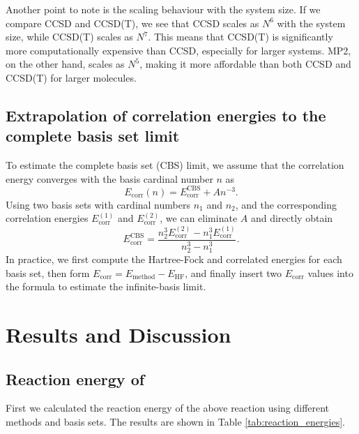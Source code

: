 \documentclass[a4paper,12pt]{scrartcl}
\begin{document}
Another point to note is the scaling behaviour with the system size. If we compare CCSD and CCSD(T), we see that CCSD scales as $N^6$ with the system size, while CCSD(T) scales as $N^7$. This means that CCSD(T) is significantly more computationally expensive than CCSD, especially for larger systems. MP2, on the other hand, scales as $N^5$, making it more affordable than both CCSD and CCSD(T) for larger molecules.

\subsection{Extrapolation of correlation energies to the complete basis set limit}

To estimate the complete basis set (CBS) limit, we assume that the correlation energy converges with the basis cardinal number $n$ as
\[
E_{\mathrm{corr}}(n) = E_{\mathrm{corr}}^{\mathrm{CBS}} + A n^{-3}.
\]
Using two basis sets with cardinal numbers $n_1$ and $n_2$, and the corresponding correlation energies $E_{\mathrm{corr}}^{(1)}$ and $E_{\mathrm{corr}}^{(2)}$, we can eliminate $A$ and directly obtain
\[
E_{\mathrm{corr}}^{\mathrm{CBS}} = \frac{n_2^{3}E_{\mathrm{corr}}^{(2)} - n_1^{3}E_{\mathrm{corr}}^{(1)}}{n_2^{3} - n_1^{3}}.
\]
In practice, we first compute the Hartree-Fock and correlated energies for each basis set, then form $E_{\mathrm{corr}} = E_{\mathrm{method}} - E_{\mathrm{HF}}$, and finally insert two $E_{\mathrm{corr}}$ values into the formula to estimate the infinite-basis limit.


\section{Results and Discussion}

\subsection{Reaction energy of }
First we calculated the reaction energy of the above reaction using different methods and basis sets. The results are shown in Table \ref{tab:reaction_energies}.
\end{document}
